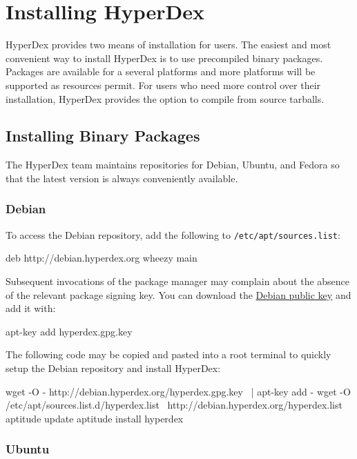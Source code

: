 \chapter{Installing HyperDex}

HyperDex provides two means of installation for users.  The easiest and most
convenient way to install HyperDex is to use precompiled binary packages.
Packages are available for a several platforms and more platforms will be
supported as resources permit.  For users who need more control over their
installation, HyperDex provides the option to compile from source tarballs.

\section{Installing Binary Packages}

The HyperDex team maintains repositories for Debian, Ubuntu, and Fedora so that
the latest version is always conveniently available.

\subsection{Debian}

To access the Debian repository, add the following to
\texttt{/etc/apt/sources.list}:

\begin{consolecode}
deb http://debian.hyperdex.org wheezy main
\end{consolecode}

Subsequent invocations of the package manager may complain about the absence of
the relevant package signing key.  You can download the
\href{http://debian.hyperdex.org/hyperdex.gpg.key}{Debian public key} and add
it with:

\begin{consolecode}
apt-key add hyperdex.gpg.key
\end{consolecode}

The following code may be copied and pasted into a root terminal to quickly
setup the Debian repository and install HyperDex:

\begin{consolecode}
wget -O - http://debian.hyperdex.org/hyperdex.gpg.key \
| apt-key add -
wget -O /etc/apt/sources.list.d/hyperdex.list \
    http://debian.hyperdex.org/hyperdex.list
aptitude update
aptitude install hyperdex
\end{consolecode}

\subsection{Ubuntu}

